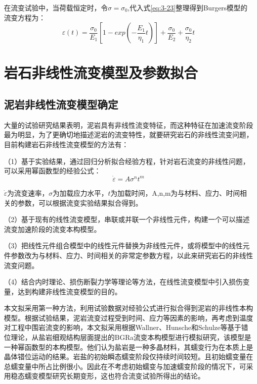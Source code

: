 在流变试验中，当荷载恒定时，令$\sigma=\sigma_0$,代入式\ref{eq:3-23}整理得到Burgers模型的流变方程为：
\begin{equation}
    \varepsilon(t)=\frac{\sigma_0}{E_1}[1-exp(-\frac{E_1}{\eta_1}t)]+\frac{\sigma_0}{E_2}+\frac{\sigma_0}{\eta_2}t
    \label{eq:3-23}
\end{equation}


\section{岩石非线性流变模型及参数拟合}
\subsection{泥岩非线性流变模型确定}
大量的试验研究结果表明，泥岩具有非线性流变特征，而这种特征在加速流变阶段最为明显，为了更确切地描述泥岩的流变特性，就要研究岩石的非线性流变问题，目前构建岩石非线性流变模型的方法有：

（1）基于实验结果，通过回归分析拟合经验方程，针对岩石流变的非线性问题，可以采用幂函数型的经验公式：
\begin{equation}
     {\dot\varepsilon}=A\sigma^nt^m
\end{equation}

$\dot\varepsilon$为流变速率，$\sigma$为加载应力水平，$t$为加载时间，A,n,m为与材料、应力、时间相关的参数，可以根据流变实验结果拟合得到。

（2）基于现有的线性流变模型，串联或并联一个非线性元件，构建一个可以描述流变加速阶段的流变本构模型。

（3）把线性元件组合模型中的线性元件替换为非线性元件，或将模型中的线性元件参数改为与材料、应力、时间相关的非常定参数方程，以此来研究岩石的非线性流变问题。

（4）结合内时理论、损伤断裂力学等理论等方法，在线性流变模型中引入损伤变量，达到构建非线性流变模型的目的。

本文拟采用第一种方法，利用试验数据对经验公式进行拟合得到泥岩的非线性本构模型。根据试验结果，泥岩流变过程受到时间、应力等因素的影响，再考虑到温度对工程中围岩流变的影响，本文拟采用根据Wallner、Hunsche和Schulze等基于错位理论，从盐岩细观结构层面提出的BGRa流变本构模型进行模拟研究\cite{1981Thermomechanical,Hunsche1999Rock}，该模型是一种幂函数型的本构模型。他们认为盐岩是一种多晶材料，其蠕变行为在本质上是晶体错位运动的结果。岩盐的初始瞬态蠕变阶段仅持续时间较短。且初始蠕变量在总蠕变量中所占比例很小。因此在不考虑初始蠕变与加速蠕变阶段的情况下，可采用稳态蠕变模型研究长期变形，这也符合流变试验所得出的结论。

